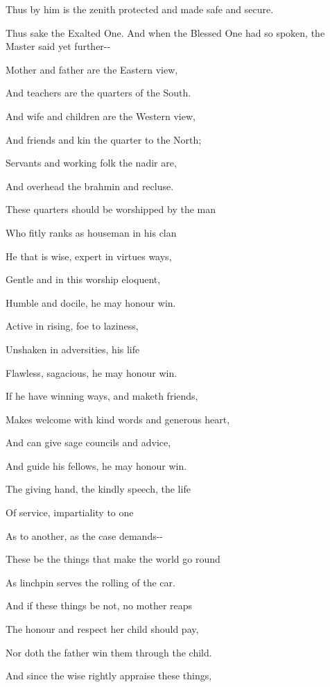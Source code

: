\documentclass[12pt,twoside]{article}
\begin{document}
Thus by him is the zenith protected and made safe and secure.

Thus sake the Exalted One. And when the Blessed One had so spoken, the
Master said yet further{}-{}-


\bigskip

Mother and father are the Eastern view,

And teachers are the quarters of the South.

And wife and children are the Western view,

And friends and kin the quarter to the North;

Servants and working folk the nadir are,

And overhead the brahmin and recluse.

These quarters should be worshipped by the man

Who fitly ranks as houseman in his clan


\bigskip

He that is wise, expert in virtue{\textquotesingle}s ways,

Gentle and in this worship eloquent,

Humble and docile, he may honour win.

Active in rising, foe to laziness,

Unshaken in adversities, his life

Flawless, sagacious, he may honour win.

If he have winning ways, and maketh friends,

Makes welcome with kind words and generous heart,

And can give sage councils and advice,

And guide his fellows, he may honour win.


\bigskip

The giving hand, the kindly speech, the life

Of service, impartiality to one

As to another, as the case demands{}-{}-

These be the things that make the world go round

As linchpin serves the rolling of the car.

And if these things be not, no mother reaps

The honour and respect her child should pay,

Nor doth the father win them through the child.

And since the wise rightly appraise these things,
\end{document}
